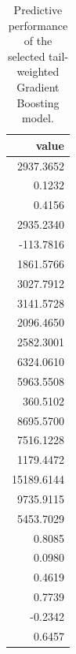 \begin{table}
\caption{Predictive performance of the selected tail-weighted Gradient Boosting model.}
\label{tab:06-selected-mean-metrics}
\begin{tabular}{r}
\toprule
value \\
\midrule
2937.3652 \\
0.1232 \\
0.4156 \\
2935.2340 \\
-113.7816 \\
1861.5766 \\
3027.7912 \\
3141.5728 \\
2096.4650 \\
2582.3001 \\
6324.0610 \\
5963.5508 \\
360.5102 \\
8695.5700 \\
7516.1228 \\
1179.4472 \\
15189.6144 \\
9735.9115 \\
5453.7029 \\
0.8085 \\
0.0980 \\
0.4619 \\
0.7739 \\
-0.2342 \\
0.6457 \\
\bottomrule
\end{tabular}
\end{table}
